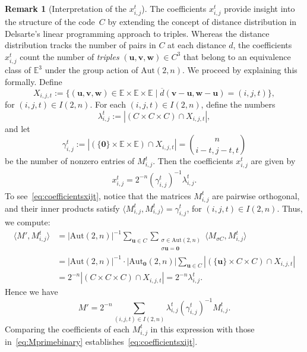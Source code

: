 \documentclass[10pt,a4paper]{article}
\newcommand{\E}{\mathbb{E}}
\theoremstyle{definition}
\newtheorem{remark}{Remark}[section]
\newcommand{\uu}{\mathbf{u}}
\newcommand{\vv}{\mathbf{v}}
\newcommand{\ww}{\mathbf{w}}
\begin{document}
\begin{remark}[Interpretation of the $x_{i,j}^t$]
The coefficients $x_{i,j}^{t}$ provide insight into the structure of the code~$C$ by extending the concept of distance distribution in Delsarte's linear programming approach to triples. Whereas the distance distribution tracks the number of pairs in $C$ at each distance $d$, the coefficients $x_{i,j}^{t}$ count the number of \emph{triples} $(\uu, \vv, \ww) \in C^3$ that belong to an equivalence class of $\E^3$ under the group action of $\text{Aut}(2,n)$. We proceed by explaining this formally. 
Define
\[
X_{i,j,t} := \{ (\uu, \vv, \ww) \in \E \times \E \times \E \mid \overline{d}( \vv-\uu, \ww-\uu) = (i, j, t) \},
\]
for  $(i, j, t) \in I(2, n) $. For each $(i, j, t) \in I(2, n)$, define the numbers
\[
\lambda_{i,j}^{t} := |(C \times C \times C) \cap X_{i,j,t}|,
\]
and let
\[
\gamma_{i,j}^{t} := |(\{\mathbf{0}\} \times \E \times \E) \cap X_{i,j,t}| = \binom{n}{ i-t, j-t,t}
\]
be the number of nonzero entries of $ M_{i,j}^t$. Then the coefficients $x_{i,j}^{t}$ are given by
\begin{align}\label{eq:coefficientsxijt}
x_{i,j}^{t} = 2^{-n} (\gamma_{i,j}^{t})^{-1} \lambda_{i,j}^{t}.
\end{align}
To see~\eqref{eq:coefficientsxijt}, notice that the matrices $ M_{i,j}^t$ are pairwise orthogonal, and their inner products satisfy $\langle M_{i,j}^t, M_{i,j}^t \rangle = \gamma_{i,j}^{t}$, for $(i, j, t) \in I(2, n)$. Thus, we compute:
\begin{align*}
\langle M', M_{i,j}^t \rangle &= |\text{Aut}(2,n)|^{-1} \sum_{\uu \in C} \sum_{\substack{\sigma \in \text{Aut}(2,n) \\ \sigma \uu = \mathbf{0}}} \langle M_{\sigma C}, M_{i,j}^t \rangle \\
&= |\text{Aut}(2,n)|^{-1} \cdot |\text{Aut}_{\mathbf{0}}(2,n)| \sum_{\uu \in C}  |(\{\uu\} \times C \times C) \cap X_{i,j,t}| \\
&= 2^{-n} |(C \times C \times C) \cap X_{i,j,t}| = 2^{-n} \lambda_{i,j}^{t}.
\end{align*}
Hence we have
\[
M' = 2^{-n} \sum_{(i,j,t) \in I(2,n)} \lambda_{i,j}^{t} (\gamma_{i,j}^{t})^{-1} M_{i,j}^t.
\]
Comparing the coefficients of each $ M_{i,j}^t$ in this expression with those in~\eqref{eq:Mprimebinary} establishes~\eqref{eq:coefficientsxijt}. 
\end{remark}
\end{document}
